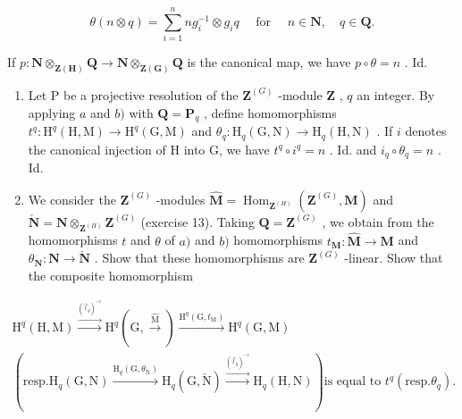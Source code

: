 \[
\theta (n \otimes q) = \sum_ {i = 1} ^ {n} n g _ {i} ^ {- 1} \otimes g _ {i} q \quad \text { for } \quad n \in \mathbf {N}, \quad q \in \mathbf {Q}.
\]

If \(p: \mathbf{N} \otimes_{\mathbf{Z}(\mathbf{H})} \mathbf{Q} \to \mathbf{N} \otimes_{\mathbf{Z}(\mathbf{G})} \mathbf{Q}\) is the canonical map, we have \(p \circ \theta = n\) . Id.
\begin{enumerate}
\def\labelenumi{\alph{enumi})}
\setcounter{enumi}{2}
\item
  Let P be a projective resolution of the \(\mathbf{Z}^{(G)}\) -module \(\mathbf{Z}\) , \(q\) an integer. By applying \(a\) and \(b)\) with \(\mathbf{Q} = \mathbf{P}_q\) , define homomorphisms \(t^q: \mathrm{H}^q(\mathrm{H}, \mathrm{M}) \to \mathrm{H}^q(\mathrm{G}, \mathrm{M})\) and \(\theta_q: \mathrm{H}_q(\mathrm{G}, \mathrm{N}) \to \mathrm{H}_q(\mathrm{H}, \mathrm{N})\) . If \(i\) denotes the canonical injection of H into G, we have \(t^q \circ i^q = n\) . Id. and \(i_q \circ \theta_q = n\) . Id.
\item
  We consider the \(\mathbf{Z}^{(G)}\) -modules \(\hat{\mathbf{M}} = \operatorname{Hom}_{\mathbf{Z}^{(H)}} (\mathbf{Z}^{(G)}, \mathbf{M})\) and \(\check{\mathbf{N}} = \mathbf{N} \otimes_{\mathbf{Z}^{(H)}} \mathbf{Z}^{(G)}\) (exercise 13). Taking \(\mathbf{Q} = \mathbf{Z}^{(G)}\) , we obtain from the homomorphisms \(t\) and \(\theta\) of \(a)\) and \(b)\) homomorphisms \(t_\mathbf{M}: \hat{\mathbf{M}} \to \mathbf{M}\) and \(\theta_\mathbf{N}: \mathbf{N} \to \check{\mathbf{N}}\) . Show that these homomorphisms are \(\mathbf{Z}^{(G)}\) -linear. Show that the composite homomorphism
\end{enumerate}

\[
\begin{array}{c} \mathrm{H} ^ {q} (\mathrm{H}, \mathrm{M}) \xrightarrow {\stackrel {{(\vec {l} _ {q}) ^ {- 1}}} {{\longrightarrow}}} \mathrm{H} ^ {q} (\mathrm{G}, \stackrel {{\hat {\mathrm{M}}}} {{\longrightarrow}}) \xrightarrow {\mathrm{H} ^ {q} (\mathrm{G} , t _ {\mathrm{M}})} \mathrm{H} ^ {q} (\mathrm{G}, \mathrm{M}) \\ (\text {resp.} \mathrm{H} _ {q} (\mathrm{G}, \mathrm{N}) \xrightarrow {\mathrm{H} _ {q} (\mathrm{G} , \theta_ {\mathrm{N}})} \mathrm{H} _ {q} (\mathrm{G}, \check {\mathrm{N}}) \xrightarrow {\stackrel {{(\vec {l} _ {q}) ^ {- 1}}} {{\longrightarrow}}} \mathrm{H} _ {q} (\mathrm{H}, \mathrm{N})) \text {is equal to } t ^ {q} (\text {resp.} \theta_ {q}). \end{array}
\]

